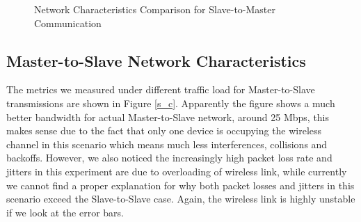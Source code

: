 \documentclass[journal,comsoc]{IEEEtran}
\begin{document}
\begin{figure}
  \centering
  \caption{Network Characteristics Comparison for Slave-to-Master Communication}
  \label{c_s} %
\end{figure}

\subsection{Master-to-Slave Network Characteristics}
The metrics we measured under different traffic load for Master-to-Slave transmissions are shown in Figure \ref{s_c}. Apparently the figure shows a much better bandwidth for actual Master-to-Slave network, around 25 Mbps, this makes sense due to the fact that only one device is occupying the wireless channel in this scenario which means much less interferences, collisions and backoffs. However, we also noticed the increasingly high packet loss rate and jitters in this experiment are due to overloading of wireless link, while currently we cannot find a proper explanation for why both packet losses and jitters in this scenario exceed the Slave-to-Slave case. Again, the wireless link is highly unstable if we look at the error bars.
\end{document}
